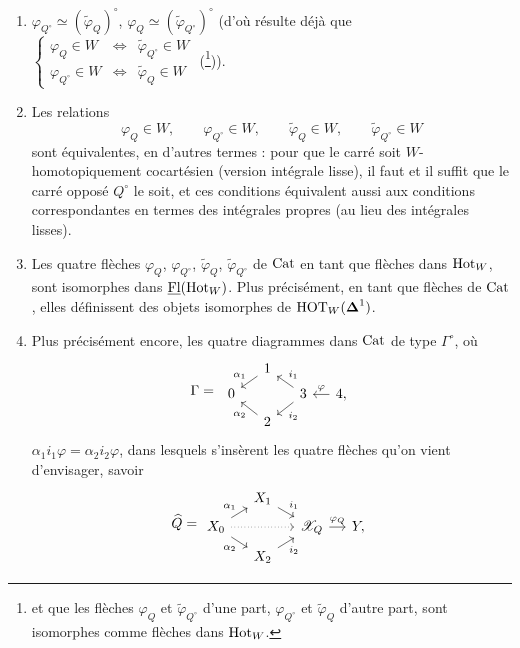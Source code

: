 \begin{enumerate}[label={}, leftmargin=2.5em]\itshape
\item[\circled{\textit{a}}] $\varphi_{Q^\circ}\simeq(\tilde{\varphi}_Q)^\circ$, $\varphi_Q\simeq(\tilde{\varphi}_{Q^\circ})^\circ$ (d'où résulte déjà que $\left\{\begin{array}{lcl}\varphi_Q\in W & \Longleftrightarrow & \tilde{\varphi}_{Q^\circ}\in W\\ \varphi_{Q^\circ}\in W & \Longleftrightarrow & \tilde{\varphi}_Q\in W\end{array}\right.$ (\footnote[90]{\upshape et que les flèches $\varphi_Q$ et $\tilde{\varphi}_{Q^\circ}$ d'une part, $\varphi_{Q^\circ}$ et $\tilde{\varphi}_Q$ d'autre part, sont isomorphes comme flèches dans $\mathrm{Hot}_W$.})).

\item[\circled{\textit{b}}] Les relations
\[
\varphi_Q\in W, \qquad \varphi_{Q^\circ}\in W, \qquad \tilde{\varphi}_Q\in W, \qquad \tilde{\varphi}_{Q^\circ}\in W
\]
sont équivalentes, en d'autres termes : pour que le carré soit $W$-homotopiquement cocartésien (version intégrale lisse), il faut et il suffit que le carré opposé $Q^\circ$ le soit, et ces conditions équivalent aussi aux conditions correspondantes en termes des intégrales propres (au lieu des intégrales lisses).

\item[\circled{\textit{c}}] Les quatre flèches $\varphi_Q$, $\varphi_{Q^\circ}$, $\tilde{\varphi}_Q$, $\tilde{\varphi}_{Q^\circ}$ de $\mathrm{Cat}$ en tant que flèches dans $\mathrm{Hot}_W$, sont isomorphes dans $\underline{\mathrm{Fl}}(\mathrm{Hot}_W)$. Plus précisément, en tant que flèches de $\mathrm{Cat}$,
elles définissent des objets isomorphes de $\mathrm{HOT}_W(\boldsymbol{\Delta}^1)$.

\item[\circled{\textit{d}}] Plus précisément encore, les quatre diagrammes dans $\mathrm{Cat}$ de type $\Gamma^\circ$, où
\[
\Gamma = \;
\begin{tikzcd}[row sep=tiny, column sep=small]
 & 1 \arrow[dl, "\alpha_1"'] & & \\
0 & & 3 \arrow[ul, "i_1"'] \arrow[dl, "i_2"] & 4, \arrow[l, "\varphi"'] \\
 & 2 \arrow[ul, "\alpha_2"] & &
\end{tikzcd}
\]
$\alpha_1i_1\varphi=\alpha_2i_2\varphi$, dans lesquels s'insèrent les quatre flèches qu'on vient d'envisager, savoir
\[
\widehat{Q} = 
\begin{tikzcd}[row sep=tiny, column sep=small]
 & X_1 \arrow[dr, "i_1"] & & \\
X_0 \arrow[ur, "\alpha_1"] \arrow[dr, "\alpha_2"'] \arrow[rr, dotted] & & \sX_Q \arrow[r, "\varphi_Q"] & Y, \\
 & X_2 \arrow[ur, "i_2"'] & &
\end{tikzcd}
\]
\end{enumerate}

